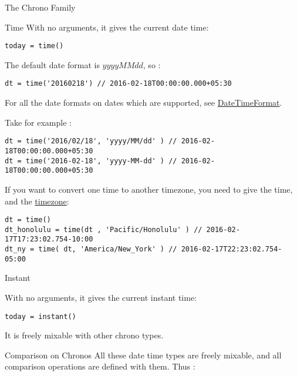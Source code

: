 \begin{section}{The Chrono Family}
\begin{subsection}{Time}
With no arguments, it gives the current date time:

\begin{lstlisting}[style=JexlStyle]
today = time()
\end{lstlisting}

The default date format is $yyyyMMdd$, so :
\begin{lstlisting}[style=JexlStyle]
dt = time('20160218') // 2016-02-18T00:00:00.000+05:30
\end{lstlisting}

For all the date formats on dates which are supported, 
see \href{http://www.joda.org/joda-time/apidocs/org/joda/time/format/DateTimeFormat.html}{DateTimeFormat}.

Take for example :

\begin{lstlisting}[style=JexlStyle]
dt = time('2016/02/18', 'yyyy/MM/dd' ) // 2016-02-18T00:00:00.000+05:30
dt = time('2016-02-18', 'yyyy-MM-dd' ) // 2016-02-18T00:00:00.000+05:30
\end{lstlisting}

If you want to convert one time to another timezone, you need to give the time, 
and the \href{http://joda-time.sourceforge.net/timezones.html}{timezone}:

\begin{lstlisting}[style=JexlStyle]
dt = time()
dt_honolulu = time(dt , 'Pacific/Honolulu' ) // 2016-02-17T17:23:02.754-10:00 
dt_ny = time( dt, 'America/New_York' ) // 2016-02-17T22:23:02.754-05:00
\end{lstlisting}

\end{subsection}


\begin{subsection}{Instant}

With no arguments, it gives the current instant time:

\begin{lstlisting}[style=JexlStyle]
today = instant()
\end{lstlisting}

It is freely mixable with other chrono types.

\end{subsection}


\begin{subsection}{Comparison on Chronos}
All these date time types are freely mixable, 
and all comparison operations are defined with them.
Thus :


\end{subsection}
\end{section}
